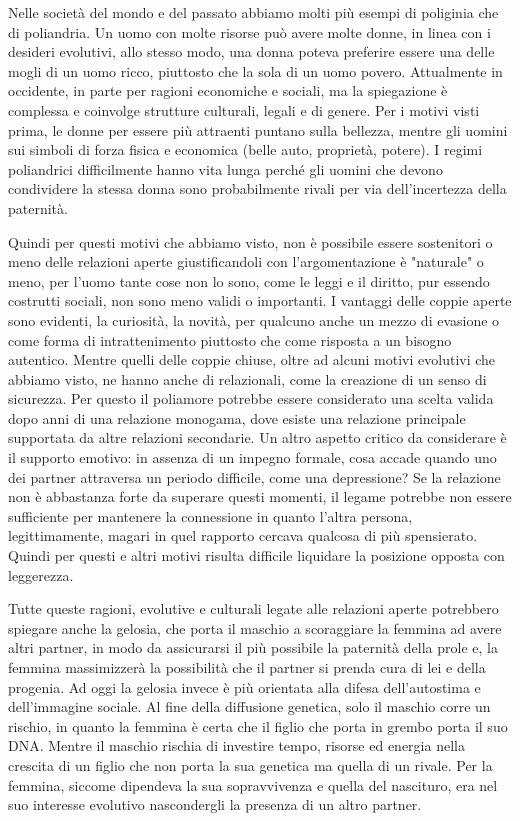 \documentclass[12pt]{book} %
\begin{document}
Nelle società del mondo e del passato abbiamo molti più esempi di poliginia che di poliandria. Un uomo con molte risorse
può avere molte donne, in linea con i desideri evolutivi, allo stesso modo, una donna poteva preferire essere una delle
mogli di un uomo ricco, piuttosto che la sola di un uomo povero. Attualmente in occidente, in parte per ragioni economiche e sociali, ma la spiegazione è complessa e coinvolge strutture culturali, legali e di genere. Per i motivi visti prima, le donne per essere
più attraenti puntano sulla bellezza, mentre gli uomini sui simboli di forza fisica e economica (belle auto, proprietà,
potere). I regimi poliandrici difficilmente hanno vita lunga perché gli uomini che devono condividere la stessa donna
sono probabilmente rivali per via dell'incertezza della paternità.

Quindi per questi motivi che abbiamo visto, non è possibile essere sostenitori o meno delle relazioni aperte giustificandoli con l'argomentazione è "naturale" o meno, per l'uomo tante cose non lo sono, come le leggi e il diritto, pur essendo costrutti sociali, non sono meno validi o importanti. I vantaggi delle coppie aperte sono evidenti, la curiosità, la novità, per qualcuno anche un mezzo di evasione o come forma di intrattenimento piuttosto che come risposta a un bisogno autentico. Mentre quelli delle coppie chiuse, oltre ad alcuni motivi evolutivi che abbiamo visto, ne hanno anche di relazionali, come la creazione di un senso di sicurezza. Per questo il poliamore potrebbe essere considerato una scelta valida dopo anni di una relazione monogama, dove esiste una relazione principale supportata da altre relazioni secondarie.
Un altro aspetto critico da considerare è il supporto emotivo: in assenza di un impegno formale, cosa accade quando uno dei partner attraversa un periodo difficile, come una depressione? Se la relazione non è abbastanza forte da superare questi momenti, il legame potrebbe non essere sufficiente per mantenere la connessione in quanto l'altra persona, legittimamente, magari in quel rapporto cercava qualcosa di più spensierato. Quindi per questi e altri motivi risulta difficile liquidare la posizione opposta con leggerezza.

Tutte queste ragioni, evolutive e culturali legate alle relazioni aperte potrebbero spiegare anche la gelosia, che porta il maschio a scoraggiare la femmina ad avere altri
partner, in modo da assicurarsi il più possibile la paternità della prole e, la femmina massimizzerà la possibilità che
il partner si prenda cura di lei e della progenia. Ad oggi la gelosia invece è più orientata alla difesa
dell'autostima e dell'immagine sociale. Al fine della diffusione genetica,
solo il maschio corre un rischio, in quanto la femmina è certa che il figlio che porta in grembo porta il suo DNA.
Mentre il maschio rischia di investire tempo, risorse ed energia nella crescita di un figlio che non porta la sua
genetica ma quella di un rivale. Per la femmina, siccome dipendeva la sua sopravvivenza e quella del nascituro, era nel
suo interesse evolutivo nascondergli la presenza di un altro partner.
\end{document}
